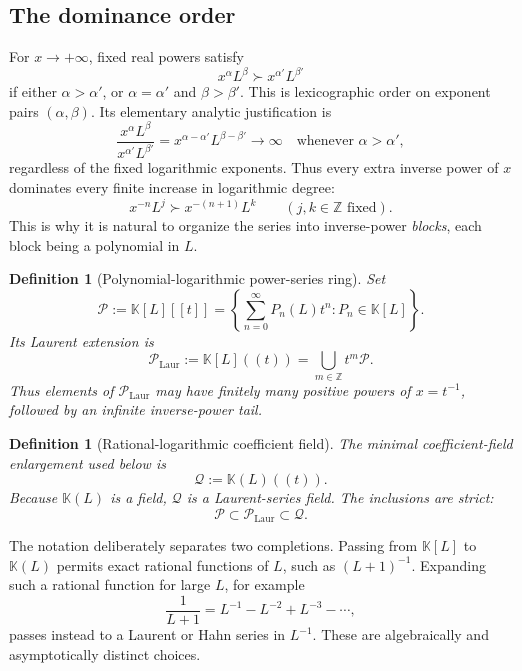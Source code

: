 \documentclass[11pt]{article}
\theoremstyle{pltheorem}
\newtheorem{definition}[theorem]{Definition}
\newcommand{\K}{\mathbb K}
\newcommand{\Z}{\mathbb Z}
\newcommand{\PL}{\mathscr P}
\newcommand{\PLL}{\mathscr P_{\mathrm{Laur}}}
\newcommand{\QPL}{\mathscr Q}
\newcommand{\set}[1]{\left\{#1\right\}}
\begin{document}
\subsection{The dominance order}

For \(x\to+\infty\), fixed real powers satisfy
\[
 x^\alpha L^\beta \succ x^{\alpha'}L^{\beta'}
\]
if either \(\alpha>\alpha'\), or \(\alpha=\alpha'\) and \(\beta>\beta'\).  This is lexicographic order on exponent pairs \((\alpha,\beta)\).  Its elementary analytic justification is
\begin{equation}\label{eq:power-beats-log}
 \frac{x^\alpha L^\beta}{x^{\alpha'}L^{\beta'}}
 =x^{\alpha-\alpha'}L^{\beta-\beta'}\longrightarrow\infty
 \quad\text{whenever }\alpha>\alpha',
\end{equation}
regardless of the fixed logarithmic exponents.  Thus every extra inverse power of \(x\) dominates every finite increase in logarithmic degree:
\begin{equation}\label{eq:block-order}
 x^{-n}L^j\succ x^{-(n+1)}L^k
 \qquad(j,k\in\Z\text{ fixed}).
\end{equation}
This is why it is natural to organize the series into inverse-power \emph{blocks}, each block being a polynomial in \(L\).

\begin{definition}[Polynomial-logarithmic power-series ring]
Set
\begin{equation}\label{eq:P-def}
 \PL:=\K[L][[t]]
 =\set{\sum_{n=0}^{\infty}P_n(L)t^n:P_n\in\K[L]}.
\end{equation}
Its Laurent extension is
\begin{equation}\label{eq:PLaur-def}
 \PLL:=\K[L]((t))
 =\bigcup_{m\in\Z}t^m\PL.
\end{equation}
Thus elements of \(\PLL\) may have finitely many positive powers of \(x=t^{-1}\), followed by an infinite inverse-power tail.
\end{definition}

\begin{definition}[Rational-logarithmic coefficient field]
The minimal coefficient-field enlargement used below is
\begin{equation}\label{eq:QPL-def}
 \QPL:=\K(L)((t)).
\end{equation}
Because \(\K(L)\) is a field, \(\QPL\) is a Laurent-series field.  The inclusions are strict:
\[
 \PL\subset\PLL\subset\QPL.
\]
\end{definition}

The notation deliberately separates two completions.  Passing from \(\K[L]\) to \(\K(L)\) permits exact rational functions of \(L\), such as \((L+1)^{-1}\).  Expanding such a rational function for large \(L\), for example
\[
 \frac1{L+1}=L^{-1}-L^{-2}+L^{-3}-\cdots,
\]
passes instead to a Laurent or Hahn series in \(L^{-1}\).  These are algebraically and asymptotically distinct choices.
\end{document}

